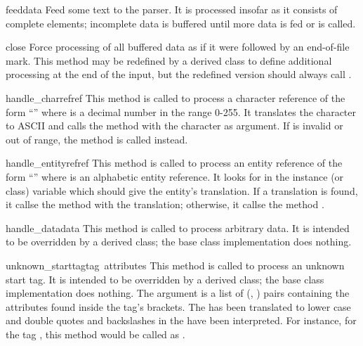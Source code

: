 \begin{funcdesc}{feed}{data}
Feed some text to the parser.  It is processed insofar as it consists
of complete elements; incomplete data is buffered until more data is
fed or  is called.
\end{funcdesc}

\begin{funcdesc}{close}{}
Force processing of all buffered data as if it were followed by an
end-of-file mark.  This method may be redefined by a derived class to
define additional processing at the end of the input, but the
redefined version should always call .
\end{funcdesc}

\begin{funcdesc}{handle_charref}{ref}
This method is called to process a character reference of the form
``'' where  is a decimal number in the
range 0-255.  It translates the character to ASCII and calls the
method  with the character as argument.  If
 is invalid or out of range, the method
 is called instead.
\end{funcdesc}

\begin{funcdesc}{handle_entityref}{ref}
This method is called to process an entity reference of the form
``'' where  is an alphabetic entity
reference.  It looks for  in the instance (or class)
variable  which should give the entity's translation.
If a translation is found, it callse the method 
with the translation; otherwise, it callse the method
.
\end{funcdesc}

\begin{funcdesc}{handle_data}{data}
This method is called to process arbitrary data.  It is intended to be
overridden by a derived class; the base class implementation does
nothing.
\end{funcdesc}

\begin{funcdesc}{unknown_starttag}{tag\, attributes}
This method is called to process an unknown start tag.  It is intended
to be overridden by a derived class; the base class implementation
does nothing.  The  argument is a list of
(, ) pairs containing the attributes found inside
the tag's \code{<>} brackets.  The  has been translated to
lower case and double quotes and backslashes in the  have
been interpreted.  For instance, for the tag
, this method would be
called as .
\end{funcdesc}


